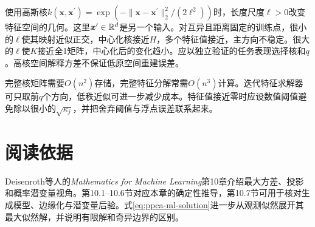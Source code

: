 使用高斯核$k(\bm x,\bm x^\prime)=\exp(-\|\bm x-\bm x^\prime\|_2^2/(2\ell^2))$时，长度尺度$\ell>0$改变特征空间的几何。这里$\bm x^\prime\in\mathbb{R}^d$是另一个输入。对互异且距离固定的训练点，很小的$\ell$使其映射近似正交，中心化核接近$H$，多个特征值接近，主方向不稳定。很大的$\ell$使$K$接近全1矩阵，中心化后的变化趋小。应以独立验证的任务表现选择核和$q$。高核空间解释方差不保证低原空间重建误差。

完整核矩阵需要$O(n^2)$存储，完整特征分解常需$O(n^3)$计算。迭代特征求解器可只取前$q$个方向，低秩近似可进一步减少成本。特征值接近零时应设数值阈值避免除以很小的$\sqrt{\kappa_j}$，并把舍弃阈值与浮点误差联系起来。


\section{阅读依据}
Deisenroth等人的\textit{Mathematics for Machine Learning}第10章介绍最大方差、投影和概率潜变量视角\cite{deisenroth2020mml}。第10.1--10.6节对应本章的确定性推导，第10.7节可用于核对生成模型、边缘化与潜变量后验。式\eqref{eq:ppca-ml-solution}进一步从观测似然展开其最大似然解，并说明有限解和奇异边界的区别。
